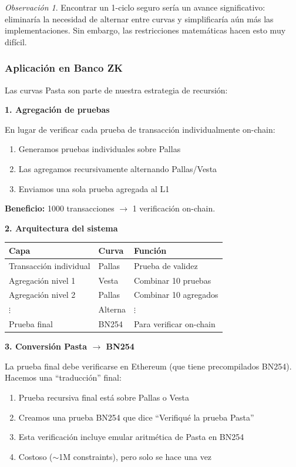 \documentclass[11pt,a4paper,twoside,openright]{book}
\theoremstyle{definition}
\theoremstyle{plain}
\theoremstyle{remark}
\newtheorem{remark}{Observación}[chapter]
\begin{document}
\begin{remark}
Encontrar un 1-ciclo seguro sería un avance significativo: eliminaría la necesidad de alternar entre curvas y simplificaría aún más las implementaciones. Sin embargo, las restricciones matemáticas hacen esto muy difícil.
\end{remark}

\subsubsection{Aplicación en Banco ZK}

\begin{bancozk}
Las curvas Pasta son parte de nuestra estrategia de recursión:

\textbf{1. Agregación de pruebas}

En lugar de verificar cada prueba de transacción individualmente on-chain:
\begin{enumerate}
    \item Generamos pruebas individuales sobre Pallas
    \item Las agregamos recursivamente alternando Pallas/Vesta
    \item Enviamos una sola prueba agregada al L1
\end{enumerate}

\textbf{Beneficio:} 1000 transacciones $\to$ 1 verificación on-chain.

\textbf{2. Arquitectura del sistema}

\begin{center}
\begin{tabular}{lll}
\toprule
\textbf{Capa} & \textbf{Curva} & \textbf{Función} \\
\midrule
Transacción individual & Pallas & Prueba de validez \\
Agregación nivel 1 & Vesta & Combinar 10 pruebas \\
Agregación nivel 2 & Pallas & Combinar 10 agregados \\
$\vdots$ & Alterna & $\vdots$ \\
Prueba final & BN254 & Para verificar on-chain \\
\bottomrule
\end{tabular}
\end{center}

\textbf{3. Conversión Pasta $\to$ BN254}

La prueba final debe verificarse en Ethereum (que tiene precompilados BN254). Hacemos una ``traducción'' final:
\begin{enumerate}
    \item Prueba recursiva final está sobre Pallas o Vesta
    \item Creamos una prueba BN254 que dice ``Verifiqué la prueba Pasta''
    \item Esta verificación incluye emular aritmética de Pasta en BN254
    \item Costoso ($\sim$1M constraints), pero solo se hace una vez
\end{enumerate}


\end{bancozk}
\end{document}
